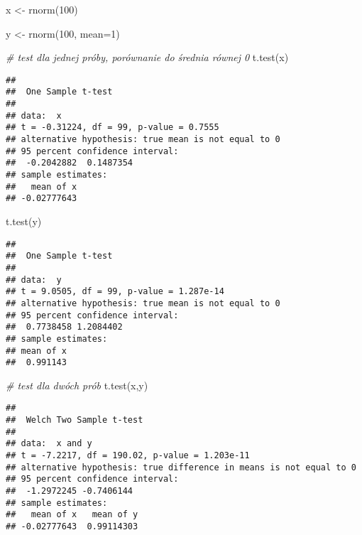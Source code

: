 \documentclass[
]{book}
\newenvironment{Shaded}{\begin{snugshade}}{\end{snugshade}}
\newcommand{\AttributeTok}[1]{\textcolor[rgb]{0.77,0.63,0.00}{#1}}
\newcommand{\CommentTok}[1]{\textcolor[rgb]{0.56,0.35,0.01}{\textit{#1}}}
\newcommand{\DecValTok}[1]{\textcolor[rgb]{0.00,0.00,0.81}{#1}}
\newcommand{\FunctionTok}[1]{\textcolor[rgb]{0.00,0.00,0.00}{#1}}
\newcommand{\NormalTok}[1]{#1}
\newcommand{\OtherTok}[1]{\textcolor[rgb]{0.56,0.35,0.01}{#1}}
\begin{document}
\begin{Shaded}
\begin{Highlighting}[]
\NormalTok{x }\OtherTok{\textless{}{-}} \FunctionTok{rnorm}\NormalTok{(}\DecValTok{100}\NormalTok{)}

\NormalTok{y }\OtherTok{\textless{}{-}} \FunctionTok{rnorm}\NormalTok{(}\DecValTok{100}\NormalTok{, }\AttributeTok{mean=}\DecValTok{1}\NormalTok{)}

\CommentTok{\# test dla jednej próby, porównanie do średnia równej 0}
\FunctionTok{t.test}\NormalTok{(x)}
\end{Highlighting}
\end{Shaded}

\begin{verbatim}
## 
##  One Sample t-test
## 
## data:  x
## t = -0.31224, df = 99, p-value = 0.7555
## alternative hypothesis: true mean is not equal to 0
## 95 percent confidence interval:
##  -0.2042882  0.1487354
## sample estimates:
##   mean of x 
## -0.02777643
\end{verbatim}

\begin{Shaded}
\begin{Highlighting}[]
\FunctionTok{t.test}\NormalTok{(y)}
\end{Highlighting}
\end{Shaded}

\begin{verbatim}
## 
##  One Sample t-test
## 
## data:  y
## t = 9.0505, df = 99, p-value = 1.287e-14
## alternative hypothesis: true mean is not equal to 0
## 95 percent confidence interval:
##  0.7738458 1.2084402
## sample estimates:
## mean of x 
##  0.991143
\end{verbatim}

\begin{Shaded}
\begin{Highlighting}[]
\CommentTok{\# test dla dwóch prób}
\FunctionTok{t.test}\NormalTok{(x,y)}
\end{Highlighting}
\end{Shaded}

\begin{verbatim}
## 
##  Welch Two Sample t-test
## 
## data:  x and y
## t = -7.2217, df = 190.02, p-value = 1.203e-11
## alternative hypothesis: true difference in means is not equal to 0
## 95 percent confidence interval:
##  -1.2972245 -0.7406144
## sample estimates:
##   mean of x   mean of y 
## -0.02777643  0.99114303
\end{verbatim}
\end{document}
